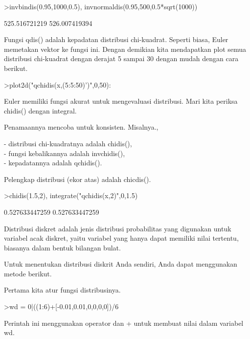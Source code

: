 \documentclass[a4paper,10pt]{article}
\begin{document}
\begin{eulernotebook}
\begin{eulercomment}
\begin{eulercomment}
\begin{eulerprompt}
>invbindis(0.95,1000,0.5), invnormaldis(0.95,500,0.5*sqrt(1000))
\end{eulerprompt}
\begin{euleroutput}
  525.516721219
  526.007419394
\end{euleroutput}
\begin{eulercomment}
Fungsi qdis() adalah kepadatan distribusi chi-kuadrat. Seperti biasa,
Euler memetakan vektor ke fungsi ini. Dengan demikian kita mendapatkan
plot semua distribusi chi-kuadrat dengan derajat 5 sampai 30 dengan
mudah dengan cara berikut.
\end{eulercomment}
\begin{eulerprompt}
>plot2d("qchidis(x,(5:5:50)')",0,50):
\end{eulerprompt}
\begin{eulercomment}
Euler memiliki fungsi akurat untuk mengevaluasi distribusi. Mari kita
periksa chidis() dengan integral.

Penamaannya mencoba untuk konsisten. Misalnya.,

- distribusi chi-kuadratnya adalah chidis(),\\
- fungsi kebalikannya adalah invchidis(),\\
- kepadatannya adalah qchidis().

Pelengkap distribusi (ekor atas) adalah chicdis().
\end{eulercomment}
\begin{eulerprompt}
>chidis(1.5,2), integrate("qchidis(x,2)",0,1.5)
\end{eulerprompt}
\begin{euleroutput}
  0.527633447259
  0.527633447259
\end{euleroutput}
\begin{eulercomment}
Distribusi diskret adalah jenis distribusi probabilitas yang digunakan
untuk variabel acak diskret, yaitu variabel yang hanya dapat memiliki
nilai tertentu, biasanya dalam bentuk bilangan bulat.

Untuk menentukan distribusi diskrit Anda sendiri, Anda dapat
menggunakan metode berikut.

Pertama kita atur fungsi distribusinya.
\end{eulercomment}
\begin{eulerprompt}
>wd = 0|((1:6)+[-0.01,0.01,0,0,0,0])/6
\end{eulerprompt}
\begin{euleroutput}
  [0,  0.165,  0.335,  0.5,  0.666667,  0.833333,  1]
\end{euleroutput}
\begin{eulercomment}
Perintah ini menggunakan operator \textbar{} dan + untuk membuat nilai dalam
variabel wd.


\end{eulercomment}
\end{eulercomment}
\end{eulercomment}
\end{eulernotebook}
\end{document}
